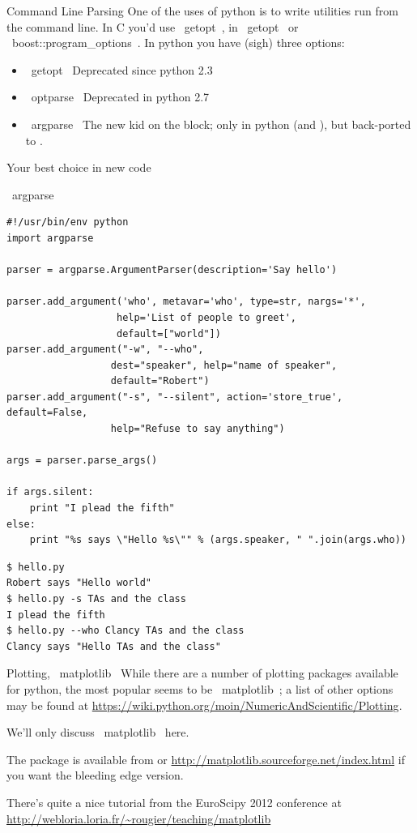 \documentclass[10pt, t]{beamer}
\let\texttt=\graytt
\let\verb=\codeDelimTwiddles
\begin{document}
\begin{frame}[fragile,label=sec-3-3]{Command Line Parsing}
 One of the uses of python is to write utilities run from the command line.  In C you'd use \verb~getopt~, 
in \CPP \verb~getopt~ or \verb~boost::program\_options~. \pause In python you have (sigh) three options:
\begin{itemize}
\item \verb~getopt~ Deprecated since python 2.3
\item \verb~optparse~ Deprecated in python 2.7
\item \verb~argparse~ The new kid on the block; only in python \texttt{2.7} (and \texttt{3.?}), but back-ported to \texttt{2.6}.
\end{itemize}
Your best choice in new code
\end{frame}

\begin{frame}[fragile,label=sec-3-4]{\verb~argparse~}
 \lstset{language=Python,label= ,caption= ,numbers=none}
\begin{lstlisting}
#!/usr/bin/env python
import argparse

parser = argparse.ArgumentParser(description='Say hello')

parser.add_argument('who', metavar='who', type=str, nargs='*',
                   help='List of people to greet', 
                   default=["world"])
parser.add_argument("-w", "--who",
                  dest="speaker", help="name of speaker", 
                  default="Robert")
parser.add_argument("-s", "--silent", action='store_true', default=False,
                  help="Refuse to say anything")

args = parser.parse_args()

if args.silent:
    print "I plead the fifth"
else:
    print "%s says \"Hello %s\"" % (args.speaker, " ".join(args.who))
\end{lstlisting}
\pause
\lstset{language=text,label= ,caption= ,numbers=none}
\begin{lstlisting}
$ hello.py 
Robert says "Hello world"
$ hello.py -s TAs and the class
I plead the fifth
$ hello.py --who Clancy TAs and the class
Clancy says "Hello TAs and the class"
\end{lstlisting}
\end{frame}
\begin{frame}[fragile,label=sec-3-5]{Plotting, \verb~matplotlib~}
 While there are a number of plotting packages available for python, the most popular
seems to be \verb~matplotlib~; a list of other options may be found at
\url{https://wiki.python.org/moin/NumericAndScientific/Plotting}.

We'll only discuss \verb~matplotlib~ here.

\pause
The package is available from \texttt{anaconda} or
\url{http://matplotlib.sourceforge.net/index.html} if you want the bleeding edge version.

\pause
\begin{block}{There's quite a nice tutorial from the EuroScipy 2012 conference at}
\url{http://webloria.loria.fr/~rougier/teaching/matplotlib}
\end{block}
\end{frame}
\end{document}
